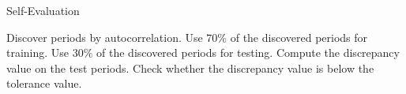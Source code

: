 \begin{frame}[allowframebreaks]{Self-Evaluation}
    \begin{algorithm}[H]
		\caption{Self-evaluation}
        \begin{algorithmic}[1]
			\State Discover periods by autocorrelation.
            \State Use \(70\%\) of the discovered periods for training.
            \State Use \(30\%\) of the discovered periods for testing.
            \State Compute the discrepancy value on the test periods.
            \State Check whether the discrepancy value is below the tolerance value.
        \end{algorithmic}
    \end{algorithm}
\end{frame}